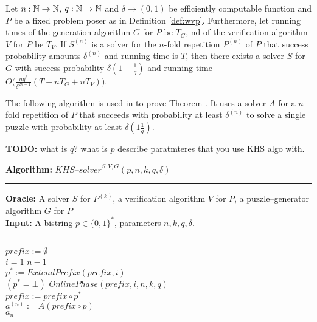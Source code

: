 \documentclass[11pt,a4paper,titlepage]{memoir}
\begin{document}
%
\begin{theorem}
  \label{th:wvp_chs}
Let $n:\mathbb{N} \rightarrow \mathbb{N}$, $q: \mathbb{N} \rightarrow \mathbb{N}$ and $\delta \rightarrow (0,1)$ be efficiently computable function
and $P$ be a fixed problem poser as in Definition \ref{def:wvp}.
Furthermore, let running times of the generation algorithm $G$ for $P$ be $T_G$, nd of the verification algorithm $V$ for $P$ be $T_V$.
If $S^{(n)}$ is a solver for the $n$-fold repetition $P^{(n)}$ of $P$ that success probability amounts $\delta^{(n)}$
and running time is $T$, then there exists a solver $S$ for $G$ with success probability $\delta(1-\frac{1}{q})$ and running time
$O\Big(\frac{nq^3}{\delta^{2n-1}}(T + nT_G + nT_V)\Big)$.
\end{theorem}
%
The following algorithm is used in \cite{canetti2004hardness} to prove Theorem \cite{th:wvp_chs}.
It uses a solver $A$ for a $n$-fold repetition of $P$ that succeeds with probability at least $\delta^{(n)}$
to solve a single puzzle with probability at least $\delta(1 \frac {1}{q})$.
%
\begin{todo}
  \textbf{TODO:} what is $q$? what is $p$ describe paratmteres that you use KHS algo with.
\end{todo}
%
\begin{codeblock}
  \textbf{Algorithm:} $\mathit{KHS\text{--}solver}^{S,V,G}(p, n, k, q, \delta)$
  \medskip\hrule
  \textbf{Oracle:} A solver $S$ for $P^{(k)}$, a verification algorithm $V$ for $P$, a puzzle--generator algorithm $G$ for $P$\\
  \textbf{Input:}  A bistring $p \in \{0,1\}^{*}$, parameters $n, k, q, \delta$.
  \medskip\hrule
  $\mathit{prefix} := \emptyset$\\
  \For $i = 1$ \To $n-1$ \Do \\
  \IndI $p^* := \mathit{ExtendPrefix(prefix, i)}$\\
  \IndI \If $(p^* = \bot)$ \Then \Return $\mathit{OnlinePhase}(\mathit{prefix}, i, n, k, q)$ \\
  \IndI \Else $\mathit{prefix} := \mathit{prefix} \circ p^*$\\
  $ a^{(n)} := A(\mathit{prefix} \circ p)$ \\
  \Return $a_n$
\end{codeblock}
%
\end{document}
